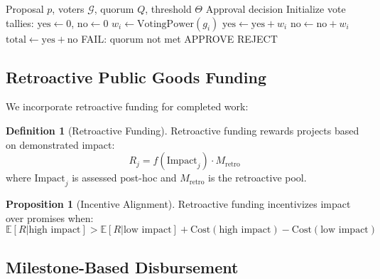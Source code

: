 \documentclass[11pt,a4paper]{article}
\theoremstyle{definition}
\newtheorem{definition}{Definition}[section]
\newtheorem{proposition}[theorem]{Proposition}
\theoremstyle{remark}
\begin{document}
\begin{algorithm}
\caption{Spending Proposal Vote}
\begin{algorithmic}[1]
\Require Proposal $p$, voters $\mathcal{G}$, quorum $Q$, threshold $\Theta$
\Ensure Approval decision
\State Initialize vote tallies: $\text{yes} \gets 0$, $\text{no} \gets 0$
    \State $w_i \gets \text{VotingPower}(g_i)$
        \State $\text{yes} \gets \text{yes} + w_i$
        \State $\text{no} \gets \text{no} + w_i$
    \EndIf
\EndFor
\State $\text{total} \gets \text{yes} + \text{no}$
    \State \Return FAIL: quorum not met
\EndIf
{}
    \State \Return APPROVE
\Else
    \State \Return REJECT
\EndIf
\end{algorithmic}
\end{algorithm}

\subsection{Retroactive Public Goods Funding}

We incorporate retroactive funding for completed work:

\begin{definition}[Retroactive Funding]
Retroactive funding rewards projects based on demonstrated impact:
\begin{equation}
    R_j = f(\text{Impact}_j) \cdot M_{\text{retro}}
\end{equation}
where $\text{Impact}_j$ is assessed post-hoc and $M_{\text{retro}}$ is the retroactive pool.
\end{definition}

\begin{proposition}[Incentive Alignment]
Retroactive funding incentivizes impact over promises when:
\begin{equation}
    \mathbb{E}[R | \text{high impact}] > \mathbb{E}[R | \text{low impact}] + \text{Cost}(\text{high impact}) - \text{Cost}(\text{low impact})
\end{equation}
\end{proposition}

\subsection{Milestone-Based Disbursement}
\end{document}
